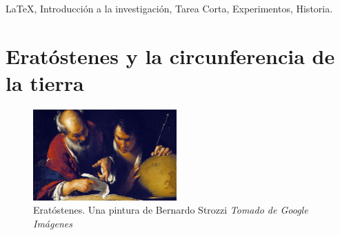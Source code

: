 \documentclass[journal]{IEEEtran}
\begin{document}







\maketitle



\begin{IEEEkeywords}
\LaTeX\xspace , Introducción a la investigación, Tarea Corta, Experimentos, Historia.
\end{IEEEkeywords}






%
\IEEEpeerreviewmaketitle



\section{Eratóstenes y la circunferencia de la tierra}
\begin{center}
  \begin{figure}[h!]
  \includegraphics[width=55mm]{eratostenes1.jpeg}
  \caption{Eratóstenes. Una pintura de Bernardo Strozzi \emph{Tomado de Google Imágenes}}
  \end{figure}
\end{center}
\end{document}
